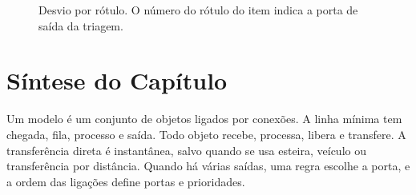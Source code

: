 \begin{figure}[ht]
\centering
{}
\caption{Desvio por rótulo. O número do rótulo do item indica a porta de saída da triagem.}
\label{fig-rotulo}
\end{figure}

\section{Síntese do Capítulo}

\begin{sintese}
Um modelo é um conjunto de objetos ligados por conexões. A linha mínima tem chegada, fila, processo e saída. Todo objeto recebe, processa, libera e transfere. A transferência direta é instantânea, salvo quando se usa esteira, veículo ou transferência por distância. Quando há várias saídas, uma regra escolhe a porta, e a ordem das ligações define portas e prioridades.
\end{sintese}
